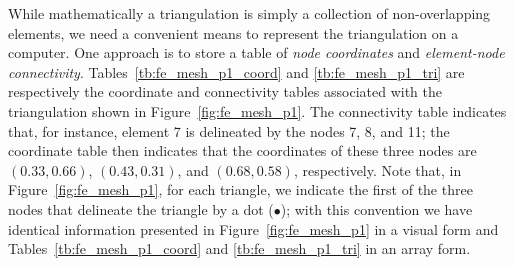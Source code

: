 While mathematically a triangulation is simply a collection of non-overlapping elements, we need a convenient means to represent the triangulation on a computer.  One approach is to store a table of \emph{node coordinates} and \emph{element-node connectivity}.  Tables~\ref{tb:fe_mesh_p1_coord} and \ref{tb:fe_mesh_p1_tri} are respectively the coordinate and connectivity tables associated with the triangulation shown in Figure~\ref{fig:fe_mesh_p1}. The connectivity table indicates that, for instance, element 7 is delineated by the nodes 7, 8, and 11; the coordinate table then indicates that the coordinates of these three nodes are $(0.33,0.66)$, $(0.43,0.31)$, and $(0.68,0.58)$, respectively.  Note that, in Figure~\ref{fig:fe_mesh_p1}, for each triangle, we indicate the first of the three nodes that delineate the triangle by a dot ($\bullet$); with this convention we have identical information presented in Figure~\ref{fig:fe_mesh_p1} in a visual form and Tables~\ref{tb:fe_mesh_p1_coord} and \ref{tb:fe_mesh_p1_tri} in an array form.

